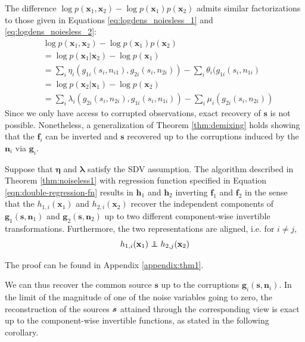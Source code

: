 \documentclass[letterpaper]{article}
\newcommand\independent{\protect\mathpalette{\protect\independenT}{\perp}}
\def\independenT#1#2{\mathrel{\rlap{$#1#2$}\mkern2mu{#1#2}}}
\theoremstyle{definition}
\begin{document}
The difference $\log p(\bm{x}_1, \bm{x}_2) - \log p(\bm{x}_1)p(\bm{x}_2)$ admits similar factorizations to those given in Equations \ref{eq:logdens_noiesless_1} and \ref{eq:logdens_noiesless_2}:
\begin{align}
&\log p(\bm{x}_1, \bm{x}_2) - \log p(\bm{x}_1) p(\bm{x}_2) \nonumber\\
&= \log p(\bm{x}_1 | \bm{x}_2) - \log p(\bm{x}_1)\nonumber\\
&= \sum_i \eta_i(g_{1i}(s_i, n_{i1}), g_{2i}(s_i, n_{2i})) - \sum_i \theta_i(g_{1i}(s_i, n_{1i}) \label{eq:noisylogdens_1}\\
&= \log p(\bm{x}_2 | \bm{x}_1) - \log p(\bm{x}_2) \nonumber\\
&= \sum_i \lambda_i(g_{2i}(s_i, n_{2i}), g_{1i}(s_i, n_{1i})) - \sum_i \mu_i(g_{2i}(s_i, n_{2i})) \label{eq:noisylogdens_2}
\end{align}
Since we only have access to corrupted observations, exact recovery of $\bm{s}$ is not possible.
Nonetheless, a generalization of Theorem \ref{thm:demixing} holds showing that the $\bm{f}_i$ can be inverted and $\bm{s}$ recovered up to the corruptions induced by the $\bm{n}_i$ via $\bm{g}_i$.
\begin{theorem}\label{thm:two-noisy-views}
Suppose that $\bm{\eta}$ and $\bm{\lambda}$ satisfy the SDV assumption.
The algorithm described in Theorem \ref{thm:noiseless1} with regression function specified in Equation \ref{eqn:double-regression-fn} results in $\bm{h}_1$ and $\bm{h}_2$ inverting $\bm{f}_1$ and $\bm{f}_2$ in the sense that the $h_{1,i}(\bm{x}_1)$ and $h_{2,i}(\bm{x}_2)$ recover the independent components of $\bm{g}_1(\bm{s}, \bm{n}_1)$ and $\bm{g}_2(\bm{s}, \bm{n}_2)$ up to two different component-wise invertible transformations. Furthermore, the two representations are aligned, i.e. for $i\not=j$,
\begin{equation*}
    h_{1,i}(\mathbf{x}_{1})\independent h_{2,j}(\mathbf{x}_{2})
\end{equation*}
\end{theorem}
The proof can be found in Appendix \ref{appendix:thm1}.




We can thus recover the common source $\bm{s}$ up to the corruptions $\bm{g}_i(\bm{s}, \bm{n}_i)$.
In the limit of the magnitude of one of the noise variables going to zero, the reconstruction of the sources ${\bm{s}}$ attained through the corresponding view is exact up to the component-wise invertible functions, as stated in the following corollary.
\end{document}
